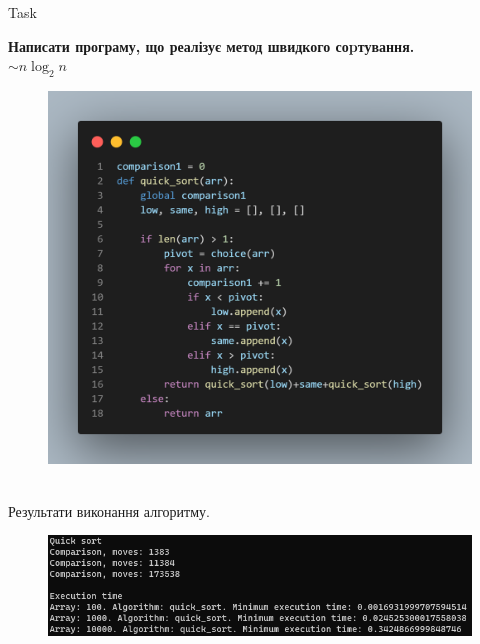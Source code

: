 \documentclass[a4paper,12pt]{article}
\newcommand{\RomanNumeralCaps}[1]{\MakeUppercase{\romannumeral #1}}
\begin{document}
\newpage
    \begin{center}
        \Large{Task \RomanNumeralCaps{2}}
    \end{center}
    \textbf{Написати програму, що реалізує метод швидкого соpтування.} \\
    $\sim n\log_2n$ 
    \begin{figure}[h!]
        \begin{minipage}[h]{1\linewidth}
            \centering
            \includegraphics[width=1\linewidth]{Prt sc/Figure_3.png}  
        \end{minipage}
    \end{figure} \\
    Результати виконання алгоритму.
    \begin{figure}[h!]
        \begin{minipage}[h]{1\linewidth}
            \centering
            \includegraphics[width=1\linewidth]{Prt sc/Figure_4.png}
        \end{minipage}
    \end{figure}
\end{document}
